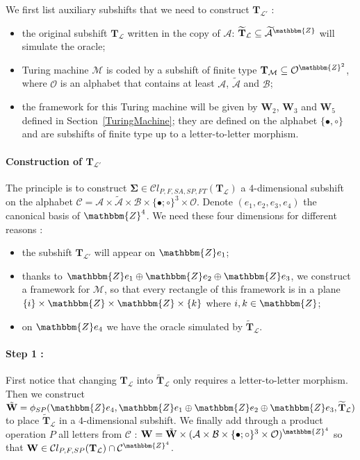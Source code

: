 \documentclass[proceedings]{stacs}
\theoremstyle{plain}\newtheorem{satz}[thm]{Satz}
\theoremstyle{definition}\newtheorem{crucial}[thm]{Crucial Definition}
\newcommand{\Z}{\mathbbm{Z}}
\newcommand{\A}{\mathcal{A}}
\newcommand{\B}{\mathcal{B}}
\newcommand{\T}{\mathbf{T}}
\newcommand{\Tfinal}{\mathbf{\Sigma}}
\newcommand{\W}{\mathbf{W}}
\newcommand{\TM}{\mathcal{M}}
\newcommand{\Lang}{\mathcal{L}}
\begin{document}
We first list auxiliary subshifts that we need to construct $\T_{\Lang'}$ :

\begin{itemize}
\item the original subshift $\T_\Lang$ written in the copy of $\A$: $\widetilde{\T}_\Lang\subseteq \widetilde{\A}^\Z$ will simulate the oracle;
\item Turing machine $\TM$ is coded by a subshift of finite type $\T_{\TM}\subseteq \mathcal{O}^{\Z^2}$, where $\mathcal{O}$ is an alphabet that contains at least $\A$, $\widetilde{\A}$ and $\B$;
\item the framework for this Turing machine will be given by $\W_2$, $\W_3$ and $\W_5$ defined in Section~\ref{TuringMachine}; they are defined on the alphabet $\{ \bullet,\circ \}$ and are subshifts of finite type up to a letter-to-letter morphism.
\end{itemize}

\paragraph{\textbf{Construction of $\T_{\Lang'}$}}
The principle is to construct $\Tfinal\in\mathcal{C}l_{P,F,SA,SP,FT}(\T_\Lang)$ a $4$-dimensional subshift on the alphabet $\mathcal{C}=\A\times\widetilde{\A}\times\B\times\{\bullet;\circ\}^3\times\mathcal{O}$. Denote $(e_1,e_2,e_3,e_4)$ the canonical basis of $\mathbbm{Z}^4$. We need these four dimensions for different reasons :
\begin{itemize}
\item the subshift $\T_{\mathcal{L'}}$ will appear on $\Z e_1$;
\item thanks to $\Z e_1\oplus\Z e_2\oplus\Z e_3$, we construct a framework for $\TM$, so that every rectangle of this framework is in a plane $\{ i\}\times\Z\times\Z\times\{ k\}$ where $i,k\in\Z$;
\item on $\Z e_4$ we have the oracle simulated by $\widetilde{\T}_\Lang$.
\end{itemize}
\paragraph{Step 1 :} First notice that changing $\T_\Lang$ into $\widetilde{\T}_\Lang$ only requires a letter-to-letter morphism. Then we construct $\tilde{\W}=\phi_{SP}(\Z e_4, \Z e_1\oplus\Z e_2\oplus\Z e_3,\widetilde{\T}_\Lang)$ to place $\widetilde{\T}_\Lang$ in a $4$-dimensional subshift. We finally add through a product operation $P$ all letters from $\mathcal{C}$ : $\W=\tilde{\W}\times(\A\times\B\times\{\bullet;\circ\}^3\times\mathcal{O})^{\Z^4}$ so that $\W \in\mathcal{C}l_{P,F,SP}(\T_\Lang)\cap\mathcal{C}^{\Z^4}$.
\end{document}
